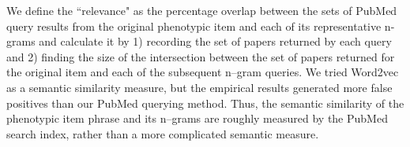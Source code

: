 \documentclass{sig-alternate-05-2015}
\newcommand{\kibitz}[2]{\ifnum\Comments=1\textcolor{#1}{#2}\fi}
\newcommand{\jette}[1]{\kibitz{red}      {[Jette: #1]}}
\begin{document}

We define the ``relevance" as the percentage overlap between the sets of PubMed query results from the original phenotypic item and each of its representative n-grams and calculate it by 1) recording the set of papers returned by each query and 2) finding the size of the intersection between the set of papers returned for the original item and each of the subsequent n--gram queries.
We tried Word2vec \cite{Mikolov:2013wc} as a semantic similarity measure, but the empirical results generated more false positives than our PubMed querying method.
Thus, the semantic similarity of the phenotypic item phrase and its n--grams are roughly measured by the PubMed search index, rather than a more complicated semantic measure.

\end{document}
